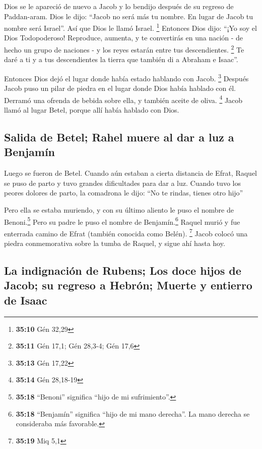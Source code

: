  Dios se le apareció de nuevo a Jacob y lo bendijo después
de su regreso de Paddan-aram.  Dios le dijo: ``Jacob no
será más tu nombre. En lugar de Jacob tu nombre será Israel''. Así que
Dios le llamó Israel. \footnote{\textbf{35:10} Gén 32,29}
 Entonces Dios dijo: ``¡Yo soy el Dios Todopoderoso!
Reproduce, aumenta, y te convertirás en una nación - de hecho un grupo
de naciones - y los reyes estarán entre tus descendientes. \footnote{\textbf{35:11}
  Gén 17,1; Gén 28,3-4; Gén 17,6}  Te daré a ti y a tus
descendientes la tierra que también di a Abraham e Isaac''.

 Entonces Dios dejó el lugar donde había estado hablando
con Jacob. \footnote{\textbf{35:13} Gén 17,22}  Después
Jacob puso un pilar de piedra en el lugar donde Dios había hablado con
él. Derramó una ofrenda de bebida sobre ella, y también aceite de oliva.
\footnote{\textbf{35:14} Gén 28,18-19}  Jacob llamó al
lugar Betel, porque allí había hablado con Dios.

\hypertarget{salida-de-betel-rahel-muere-al-dar-a-luz-a-benjamuxedn}{%
\subsection{Salida de Betel; Rahel muere al dar a luz a
Benjamín}\label{salida-de-betel-rahel-muere-al-dar-a-luz-a-benjamuxedn}}

 Luego se fueron de Betel. Cuando aún estaban a cierta
distancia de Efrat, Raquel se puso de parto y tuvo grandes dificultades
para dar a luz.  Cuando tuvo los peores dolores de parto,
la comadrona le dijo: ``No te rindas, tienes otro hijo''

 Pero ella se estaba muriendo, y con su último aliento le
puso el nombre de Benoni.\footnote{\textbf{35:18} ``Benoni'' significa
  ``hijo de mi sufrimiento''.} Pero su padre le puso el nombre de
Benjamín.\footnote{\textbf{35:18} ``Benjamín'' significa ``hijo de mi
  mano derecha''. La mano derecha se consideraba más favorable.}
 Raquel murió y fue enterrada camino de Efrat (también
conocida como Belén). \footnote{\textbf{35:19} Miq 5,1} 
Jacob colocó una piedra conmemorativa sobre la tumba de Raquel, y sigue
ahí hasta hoy.

\hypertarget{la-indignaciuxf3n-de-rubens-los-doce-hijos-de-jacob-su-regreso-a-hebruxf3n-muerte-y-entierro-de-isaac}{%
\subsection{La indignación de Rubens; Los doce hijos de Jacob; su
regreso a Hebrón; Muerte y entierro de
Isaac}\label{la-indignaciuxf3n-de-rubens-los-doce-hijos-de-jacob-su-regreso-a-hebruxf3n-muerte-y-entierro-de-isaac}}

